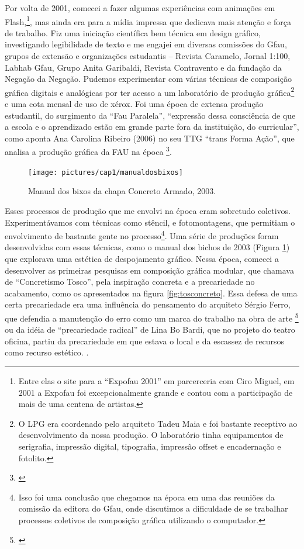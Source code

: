  Por volta de 2001, comecei a fazer algumas experiências com animações em Flash,\footnote{Entre elas o site para a ``Expofau 2001'' em parcerceria com Ciro Miguel, em 2001 a Expofau foi excepcionalmente grande e contou com a participação de mais de uma centena de artistas.}, mas ainda era para a mídia impressa que dedicava mais atenção e força de trabalho. Fiz uma iniciação científica bem técnica em design gráfico, investigando legibilidade de texto  e me engajei em diversas comissões do Gfau, grupos de extensão e organizações estudantis – Revista Caramelo, Jornal 1:100, Labhab Gfau, Grupo Anita Garibaldi, Revista Contravento e da fundação da Negação da Negação. Pudemos experimentar com várias técnicas de composição gráfica digitais e analógicas por ter acesso a um laboratório de produção gráfica\footnote{O LPG era coordenado pelo arquiteto Tadeu Maia e foi bastante receptivo ao desenvolvimento da nossa produção. O laboratório tinha equipamentos de serigrafia, impressão digital, tipografia, impressão offset e encadernação e fotolito.} e uma cota mensal de uso de xérox. Foi uma época de extensa produção estudantil, do surgimento da ``Fau Paralela'', ``expressão dessa consciência de que a escola e o aprendizado estão em grande parte fora da instituição, do curricular'', como aponta Ana Carolina Ribeiro (2006) no seu TTG ``trans Forma Ação'', que analisa a produção gráfica da FAU na época \footnote{\cite{Ribeiro2006}}. 

\begin{figure}

\texttt{[image: pictures/cap1/manualdosbixos]}
\caption{Manual dos bixos da chapa Concreto Armado, 2003.}
\label{fig:bichos}
\end{figure}

Esses processos de produção que me envolvi na época eram sobretudo coletivos. Experimentávamos com técnicas como stêncil, e fotomontagens, que permitiam o envolvimento de bastante gente no processo\footnote{Isso foi uma conclusão que chegamos na época em uma das reuniões da comissão da editora do Gfau, onde discutimos a dificuldade de se trabalhar processos coletivos de composição gráfica utilizando o computador.}. Uma série de produções foram desenvolvidas com essas técnicas, como o manual dos bichos de 2003 (Figura \ref{fig:bichos}) que explorava uma estética de despojamento gráfico. Nessa época, comecei a desenvolver as primeiras pesquisas em composição gráfica modular, que chamava de ``Concretismo Tosco'', pela inspiração concreta e a precariedade no acabamento, como os apresentados na figura \ref{fig:tosconcreto}. Essa defesa de uma certa precariedade era uma influência do pensamento do arquiteto Sérgio Ferro, que defendia a manutenção do erro como um marca do trabalho na obra de arte \footnote{\cite{FerroSergio2002}} ou da idéia de ``precariedade radical'' de Lina Bo Bardi, que no projeto do teatro oficina, partiu da precariedade em que estava o local e da escassez de recursos como recurso estético.  \cite{Macedo2015}. 

